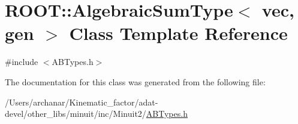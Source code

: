 \hypertarget{classROOT_1_1Minuit2_1_1AlgebraicSumType_3_01vec_00_01gen_01_4}{}\section{R\+O\+OT\+:\+:Algebraic\+Sum\+Type$<$ vec, gen $>$ Class Template Reference}
\label{classROOT_1_1Minuit2_1_1AlgebraicSumType_3_01vec_00_01gen_01_4}


{\ttfamily \#include $<$A\+B\+Types.\+h$>$}



The documentation for this class was generated from the following file\+:\begin{DoxyCompactItemize}
\item 
/\+Users/archanar/\+Kinematic\+\_\+factor/adat-\/devel/other\+\_\+libs/minuit/inc/\+Minuit2/\mbox{\hyperlink{adat-devel_2other__libs_2minuit_2inc_2Minuit2_2ABTypes_8h}{A\+B\+Types.\+h}}\end{DoxyCompactItemize}
